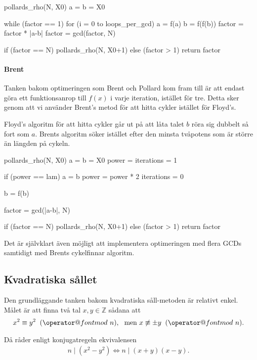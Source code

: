\documentclass[a4paper,12pt]{article}
\makeatletter
\def\imod#1{\allowbreak\mkern10mu({\operator@font mod}\,\,#1)}
\renewcommand{\*}{\ensuremath{\cdot}}
\makeatother
\begin{document}
pollards_rho(N, X0)
    a = b = X0

    while (factor == 1)
        for (i = 0 to loops_per_gcd)
            a = f(a)
            b = f(f(b))
            factor = factor * |a-b|
        factor = gcd(factor, N)
    
    if (factor == N)
        pollards_rho(N, X0+1)
    else (factor > 1)
        return factor

\paragraph{Brent}

Tanken bakom optimeringen som Brent och Pollard kom fram till är att endast göra ett funktionsanrop till $f(x)$ i varje iteration, istället för tre. Detta sker genom att vi använder Brent's metod för att hitta cykler istället för Floyd's. 

Floyd's algoritm för att hitta cykler går ut på att låta talet $b$ röra sig dubbelt så fort som $a$. Brents algoritm söker istället efter den minsta tvåpotens som är större än längden på cykeln.

pollards_rho(N, X0)
    a = b = X0
    power = iterations = 1

    if (power == lam)
        a = b
        power = power * 2
        iterations = 0
    
    b = f(b)

    factor = gcd(|a-b|, N)
    
    if (factor == N)
        pollards_rho(N, X0+1)
    else (factor > 1)
        return factor

Det är självklart även möjligt att implementera optimeringen med flera GCDs samtidigt med Brents cykelfinnar algoritm.


\subsection{Kvadratiska sållet}

Den grundläggande tanken bakom kvadratiska såll-metoden är relativt enkel. Målet
är att finna två tal $x, y \in \mathbb{Z}$ sådana att
\begin{align*}
    x^2 \equiv y^2 \imod{n}, \ \text{ men } x \not\equiv \pm y \imod{n}.
\end{align*}

Då råder enligt konjugatregeln ekvivalensen
\begin{align*}
    n \mid (x^2 - y^2) \Leftrightarrow n \mid (x+y)(x-y).
\end{align*}
\end{document}
